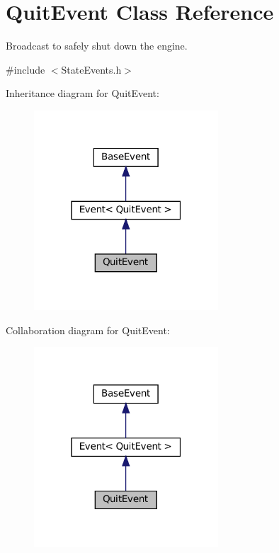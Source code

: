\hypertarget{classQuitEvent}{}\section{Quit\+Event Class Reference}
\label{classQuitEvent}


Broadcast to safely shut down the engine.  




{\ttfamily \#include $<$State\+Events.\+h$>$}



Inheritance diagram for Quit\+Event\+:\nopagebreak
\begin{figure}[H]
\begin{center}
\leavevmode
\includegraphics[width=195pt]{classQuitEvent__inherit__graph}
\end{center}
\end{figure}


Collaboration diagram for Quit\+Event\+:\nopagebreak
\begin{figure}[H]
\begin{center}
\leavevmode
\includegraphics[width=195pt]{classQuitEvent__coll__graph}
\end{center}
\end{figure}
